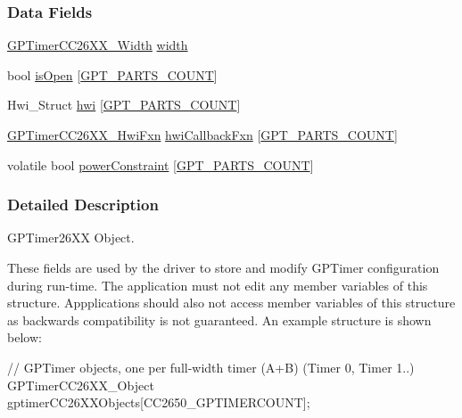 \subsubsection*{Data Fields}
\begin{DoxyCompactItemize}
\item 
\hyperlink{_g_p_timer_c_c26_x_x_8h_a37f7594eb4084eff43d5b80bb6418ec7}{G\+P\+Timer\+C\+C26\+X\+X\+\_\+\+Width} \hyperlink{struct_g_p_timer_c_c26_x_x___object_a81ee4bac962aee8e9d7289822d1e8005}{width}
\item 
bool \hyperlink{struct_g_p_timer_c_c26_x_x___object_a142063414eb9531ee48f69383a008e53}{is\+Open} \mbox{[}\hyperlink{_g_p_timer_c_c26_x_x_8h_aff5462fa33c306f2c8bd29284fd898b0a492b59ed96b96d5bddcdee40e78712b0}{G\+P\+T\+\_\+\+P\+A\+R\+T\+S\+\_\+\+C\+O\+U\+N\+T}\mbox{]}
\item 
Hwi\+\_\+\+Struct \hyperlink{struct_g_p_timer_c_c26_x_x___object_a44cb93de115e2d6407c07aef920082c3}{hwi} \mbox{[}\hyperlink{_g_p_timer_c_c26_x_x_8h_aff5462fa33c306f2c8bd29284fd898b0a492b59ed96b96d5bddcdee40e78712b0}{G\+P\+T\+\_\+\+P\+A\+R\+T\+S\+\_\+\+C\+O\+U\+N\+T}\mbox{]}
\item 
\hyperlink{_g_p_timer_c_c26_x_x_8h_a6b9b95974e20f85ccd3f8463fdda84f1}{G\+P\+Timer\+C\+C26\+X\+X\+\_\+\+Hwi\+Fxn} \hyperlink{struct_g_p_timer_c_c26_x_x___object_aee0902921b94b4630636c02026b1a2cf}{hwi\+Callback\+Fxn} \mbox{[}\hyperlink{_g_p_timer_c_c26_x_x_8h_aff5462fa33c306f2c8bd29284fd898b0a492b59ed96b96d5bddcdee40e78712b0}{G\+P\+T\+\_\+\+P\+A\+R\+T\+S\+\_\+\+C\+O\+U\+N\+T}\mbox{]}
\item 
volatile bool \hyperlink{struct_g_p_timer_c_c26_x_x___object_a780da20c760fc5ff1d9dca2cc63efeca}{power\+Constraint} \mbox{[}\hyperlink{_g_p_timer_c_c26_x_x_8h_aff5462fa33c306f2c8bd29284fd898b0a492b59ed96b96d5bddcdee40e78712b0}{G\+P\+T\+\_\+\+P\+A\+R\+T\+S\+\_\+\+C\+O\+U\+N\+T}\mbox{]}
\end{DoxyCompactItemize}


\subsubsection{Detailed Description}
G\+P\+Timer26\+X\+X Object. 

These fields are used by the driver to store and modify G\+P\+Timer configuration during run-\/time. The application must not edit any member variables of this structure. Appplications should also not access member variables of this structure as backwards compatibility is not guaranteed. An example structure is shown below\+: 
\begin{DoxyCode}
\textcolor{comment}{// GPTimer objects, one per full-width timer (A+B) (Timer 0, Timer 1..)}
GPTimerCC26XX_Object gptimerCC26XXObjects[CC2650\_GPTIMERCOUNT];
\end{DoxyCode}
 

